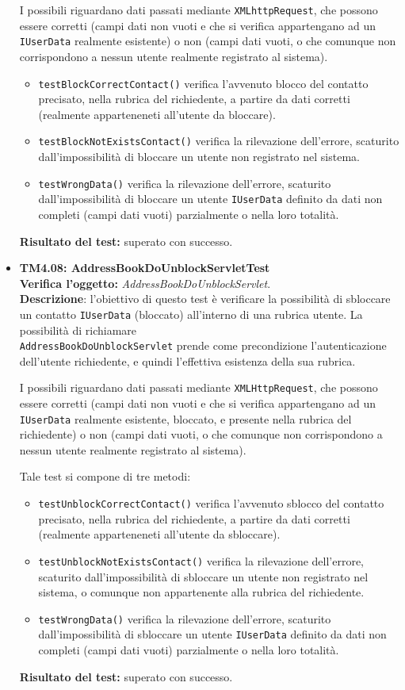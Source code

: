 \begin{itemize}
I possibili  riguardano dati passati mediante \texttt{XMLhttpRequest}, che possono essere corretti (campi dati non vuoti e che si verifica appartengano ad un \texttt{IUserData} realmente esistente) o non (campi dati vuoti, o che comunque non corrispondono a nessun utente realmente registrato al sistema).
\begin{itemize}
\item \texttt{testBlockCorrectContact()} verifica l'avvenuto blocco del contatto precisato, nella rubrica del richiedente, a partire da dati corretti (realmente apparteneneti all'utente da bloccare).
\item \texttt{testBlockNotExistsContact()} verifica la rilevazione dell'errore, scaturito dall'impossibilità di bloccare un utente non registrato nel sistema.
\item \texttt{testWrongData()} verifica la rilevazione dell'errore, scaturito dall'impossibilità di bloccare un utente \texttt{IUserData} definito da dati non completi (campi dati vuoti) parzialmente o nella loro totalità.
\end{itemize}
\textbf{Risultato del test:} superato con successo.

\item \textbf{TM4.08: AddressBookDoUnblockServletTest}\\
\textbf{Verifica l'oggetto:} \textit{AddressBookDoUnblockServlet}.\\
\textbf{Descrizione}: l'obiettivo di questo test è verificare la possibilità di sbloccare un contatto \texttt{IUserData} (bloccato) all'interno di una rubrica utente. La possibilità di richiamare\\ \texttt{AddressBookDoUnblockServlet} prende come precondizione l'autenticazione dell'utente richiedente, e quindi l'effettiva esistenza della sua rubrica.

I possibili  riguardano dati passati mediante \texttt{XMLHttpRequest}, che possono essere corretti (campi dati non vuoti e che si verifica appartengano ad un \texttt{IUserData} realmente esistente, bloccato, e presente nella rubrica del richiedente) o non (campi dati vuoti, o che comunque non corrispondono a nessun utente realmente registrato al sistema).

Tale test si compone di tre metodi:
\begin{itemize}
\item \texttt{testUnblockCorrectContact()} verifica l'avvenuto sblocco del contatto precisato, nella rubrica del richiedente, a partire da dati corretti (realmente apparteneneti all'utente da sbloccare).
\item \texttt{testUnblockNotExistsContact()} verifica la rilevazione dell'errore, scaturito dall'impossibilità di sbloccare un utente non registrato nel sistema, o comunque non appartenente alla rubrica del richiedente.
\item \texttt{testWrongData()} verifica la rilevazione dell'errore, scaturito dall'impossibilità di sbloccare un utente \texttt{IUserData} definito da dati non completi (campi dati vuoti) parzialmente o nella loro totalità.
\end{itemize}
\textbf{Risultato del test:} superato con successo.


\end{itemize}
